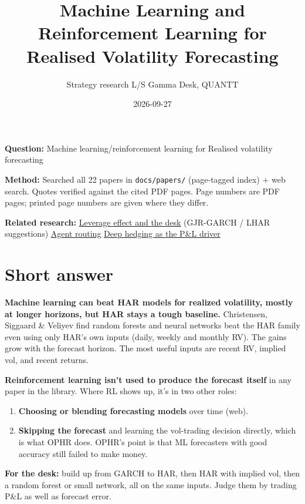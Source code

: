 \documentclass{article}
\title{Machine Learning and Reinforcement Learning for Realised Volatility Forecasting}
\author{Strategy research \textperiodcentered{} L/S Gamma Desk, QUANTT}
\date{2026-09-27}
\begin{document}
\maketitle

\textbf{Question:} Machine learning/\allowbreak{}reinforcement learning for Realised volatility forecasting

\textbf{Method:} Searched all 22 papers in \texttt{docs/\allowbreak{}papers/\allowbreak{}} (page-tagged index) + web search. Quotes verified against the cited PDF pages. Page numbers are PDF pages; printed page numbers are given where they differ.

\textbf{Related research:} \href{2026-09-27-leverage-effect-and-the-ls-gamma-desk.pdf}{Leverage effect and the desk} (GJR-GARCH /\allowbreak{} LHAR suggestions) \textperiodcentered{} \href{2026-09-27-agent-routing-which-algo-to-run.pdf}{Agent routing} \textperiodcentered{} \href{2026-09-27-deep-hedging-as-gamma-scalping-pnl-driver.pdf}{Deep hedging as the P\&L driver}

\section{Short answer}

\textbf{Machine learning can beat HAR models for realized volatility, mostly at longer horizons, but HAR stays a tough baseline.} Christensen, Siggaard \& Veliyev find random forests and neural networks beat the HAR family even using only HAR's own inputs (daily, weekly and monthly RV). The gains grow with the forecast horizon. The most useful inputs are recent RV, implied vol, and recent returns.

\textbf{Reinforcement learning isn't used to produce the forecast itself} in any paper in the library. Where RL shows up, it's in two other roles:

\begin{enumerate}

\item \textbf{Choosing or blending forecasting models} over time (web).

\item \textbf{Skipping the forecast} and learning the vol-trading decision directly, which is what OPHR does. OPHR's point is that ML forecasters with good accuracy still failed to make money.

\end{enumerate}

\textbf{For the desk:} build up from GARCH to HAR, then HAR with implied vol, then a random forest or small network, all on the same inputs. Judge them by trading P\&L as well as forecast error.
\end{document}
